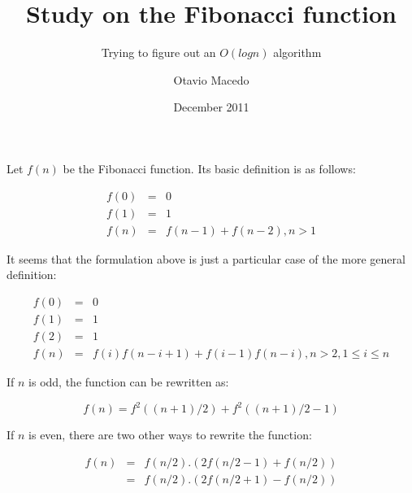 \documentclass{scrartcl}
\title{Study on the Fibonacci function}
\subtitle{Trying to figure out an $O(log n)$ algorithm}
\author{Otavio Macedo}
\date{December 2011}
\begin{document}
   \maketitle

Let $f(n)$ be the Fibonacci function. Its basic definition is as follows:

\begin{eqnarray*}
f(0) & = & 0\\
f(1) & = & 1\\
f(n) & = & f(n - 1) + f(n - 2), n > 1
\end{eqnarray*}

It seems that the formulation above is just a particular case of the more general definition:

\begin{eqnarray*}
f(0) & = & 0\\
f(1) & = & 1\\
f(2) & = & 1\\
f(n) & = & f(i)f(n - i + 1) + f(i - 1)f(n - i), n > 2, 1 \le i \le n
\end{eqnarray*}

If $n$ is odd, the function can be rewritten as:

$$f(n) = f^2((n+1)/2) + f^2((n+1)/2 - 1)$$

If $n$ is even, there are two other ways to rewrite the function:

\begin{eqnarray*}
f(n) & = & f(n/2).(2f(n/2 - 1) + f(n/2)) \\
      & = & f(n/2).(2f(n/2 + 1) - f(n/2))
\end{eqnarray*}
\end{document}
